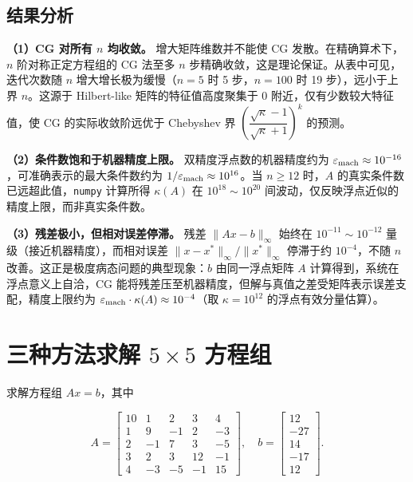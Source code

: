 \documentclass[10pt, a4paper]{article}
\begin{document}
\subsection{结果分析}

\textbf{（1）CG 对所有 $n$ 均收敛。}
增大矩阵维数并不能使 CG 发散。在精确算术下，$n$ 阶对称正定方程组的 CG 法至多 $n$ 步精确收敛，这是理论保证。从表中可见，迭代次数随 $n$ 增大增长极为缓慢（$n=5$ 时 5 步，$n=100$ 时 19 步），远小于上界 $n$。这源于 Hilbert-like 矩阵的特征值高度聚集于 $0$ 附近，仅有少数较大特征值，使 CG 的实际收敛阶远优于 Chebyshev 界
$\left(\dfrac{\sqrt{\kappa}-1}{\sqrt{\kappa}+1}\right)^k$
的预测。

\textbf{（2）条件数饱和于机器精度上限。}
双精度浮点数的机器精度约为 $\varepsilon_{\rm mach} \approx 10^{-16}$，可准确表示的最大条件数约为 $1/\varepsilon_{\rm mach} \approx 10^{16}$。当 $n\geq 12$ 时，$A$ 的真实条件数已远超此值，\texttt{numpy} 计算所得 $\kappa(A)$ 在 $10^{18}\sim10^{20}$ 间波动，仅反映浮点近似的精度上限，而非真实条件数。

\textbf{（3）残差极小，但相对误差停滞。}
残差 $\|Ax-b\|_\infty$ 始终在 $10^{-11}\sim10^{-12}$ 量级（接近机器精度），而相对误差 $\|x-x^*\|_\infty/\|x^*\|_\infty$ 停滞于约 $10^{-4}$，不随 $n$ 改善。这正是极度病态问题的典型现象：$b$ 由同一浮点矩阵 $A$ 计算得到，系统在浮点意义上自洽，CG 能将残差压至机器精度，但解与真值之差受矩阵表示误差支配，精度上限约为 $\varepsilon_{\rm mach}\cdot\kappa(A)\approx10^{-4}$（取 $\kappa=10^{12}$ 的浮点有效分量估算）。

\section{三种方法求解 $5\times5$ 方程组}

求解方程组 $Ax=b$，其中

\[
A = \begin{bmatrix}
10 &  1 &  2 &  3 &  4 \\
 1 &  9 & -1 &  2 & -3 \\
 2 & -1 &  7 &  3 & -5 \\
 3 &  2 &  3 & 12 & -1 \\
 4 & -3 & -5 & -1 & 15
\end{bmatrix}, \quad
b = \begin{bmatrix}12 \\ -27 \\ 14 \\ -17 \\ 12\end{bmatrix}.
\]
\end{document}
